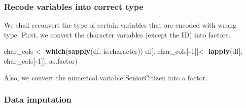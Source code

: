 \documentclass[
  twoside]{article}
\newenvironment{Shaded}{\begin{snugshade}}{\end{snugshade}}
\newcommand{\DecValTok}[1]{\textcolor[rgb]{0.00,0.00,0.81}{#1}}
\newcommand{\FunctionTok}[1]{\textcolor[rgb]{0.13,0.29,0.53}{\textbf{#1}}}
\newcommand{\NormalTok}[1]{#1}
\newcommand{\OtherTok}[1]{\textcolor[rgb]{0.56,0.35,0.01}{#1}}
\newcommand{\SpecialCharTok}[1]{\textcolor[rgb]{0.81,0.36,0.00}{\textbf{#1}}}
\begin{document}
\hypertarget{recode-variables-into-correct-type}{%
\subsubsection{Recode variables into correct
type}\label{recode-variables-into-correct-type}}

We shall reconvert the type of certain variables that are encoded with
wrong type. First, we convert the character variables (except the ID)
into factors.

\begin{Shaded}
\begin{Highlighting}[]
\NormalTok{char\_cols }\OtherTok{\textless{}{-}} \FunctionTok{which}\NormalTok{(}\FunctionTok{sapply}\NormalTok{(df, is.character))}
\NormalTok{df[, char\_cols[}\SpecialCharTok{{-}}\DecValTok{1}\NormalTok{]]}\OtherTok{\textless{}{-}} \FunctionTok{lapply}\NormalTok{(df[, char\_cols[}\SpecialCharTok{{-}}\DecValTok{1}\NormalTok{]], as.factor) }
\end{Highlighting}
\end{Shaded}

Also, we convert the numerical variable SeniorCitizen into a factor.

\begin{Shaded}
\end{Shaded}

\hypertarget{data-imputation}{%
\subsubsection{Data imputation}\label{data-imputation}}
\end{document}
